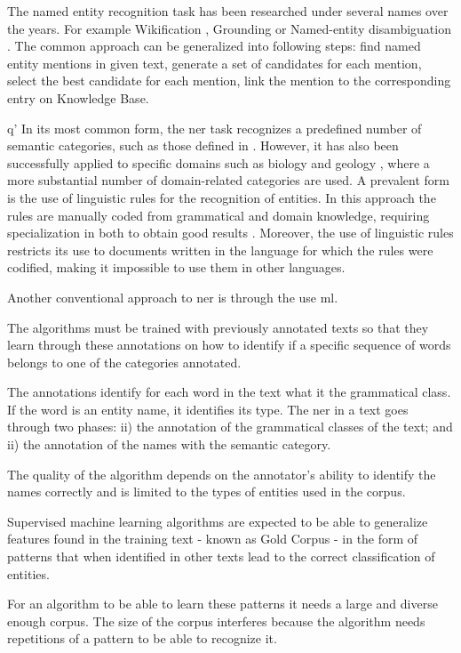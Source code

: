 The named entity recognition task has been researched under several names over the years. For example Wikification \cite{Ratinov:2011}, Grounding \cite{leidner2003grounding} or Named-entity disambiguation \cite{hoffart2011robust}. The common approach can be generalized into following steps: find named entity mentions in given text, generate a set of candidates for each mention, select the best candidate for each mention, link the mention to the corresponding entry on Knowledge Base.

q'
In its most common form, the \gls{ner} task recognizes a predefined number of semantic categories, such as those defined in \cite{grishman1996message}. However, it has also been successfully applied to specific domains such as biology \cite{campos2012biomedical} and geology \cite{sobhana2010conditional}, where a more substantial number of domain-related categories are used. A prevalent form is the use of linguistic rules for the recognition of entities. In this approach the rules are manually coded from grammatical and domain knowledge, requiring specialization in both to obtain good results \cite{nadeau2007survey}. Moreover, the use of linguistic rules restricts its use to documents written in the language for which the rules were codified, making it impossible to use them in other languages.

Another conventional approach to \gls{ner} is through the use \gls{ml}.

The algorithms must be trained with previously annotated texts so that they learn through these annotations on how to identify if a specific sequence of words belongs to one of the categories annotated. 

The annotations identify for each word in the text what it the grammatical class. If the word is an entity name, it identifies its type. The \gls{ner} in a text goes through two phases: ii) the annotation of the grammatical classes of the text; and ii) the annotation of the names with the semantic category.

The quality of the algorithm depends on the annotator's ability to identify the names correctly and is limited to the types of entities used in the corpus. 

Supervised machine learning algorithms are expected to be able to generalize features found in the training text - known as Gold Corpus - in the form of patterns that when identified in other texts lead to the correct classification of entities. 

For an algorithm to be able to learn these patterns it needs a large and diverse enough corpus. The size of the corpus interferes because the algorithm needs repetitions of a pattern to be able to recognize it. 

